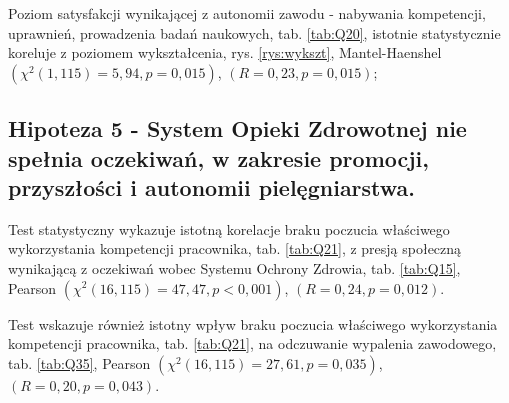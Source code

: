 \documentclass[a4paper,12pt,twoside,openright]{mwrep}
\begin{document}
  
  

Poziom satysfakcji wynikającej z autonomii zawodu  - nabywania kompetencji, uprawnień, prowadzenia badań naukowych, tab. \ref{tab:Q20}, istotnie statystycznie koreluje z poziomem wykształcenia, rys. \ref{rys:wykszt}, Mantel-Haenshel $(\chi^2 (1, 115) = 5,94, p = 0,015)$, $(R = 0,23, p = 0,015)$; 
 	
	


   
	

\vspace{\baselineskip} 

\subsection*{Hipoteza 5 - System Opieki Zdrowotnej nie spełnia oczekiwań, w zakresie promocji, przyszłości i autonomii pielęgniarstwa.}


Test statystyczny wykazuje istotną korelacje braku poczucia właściwego wykorzystania kompetencji pracownika, tab. \ref{tab:Q21}, z presją społeczną wynikającą z oczekiwań wobec Systemu Ochrony Zdrowia, tab. \ref{tab:Q15}, Pearson $(\chi^2 (16, 115) = 47,47, p < 0,001)$, $(R = 0,24, p = 0,012)$.


Test wskazuje również istotny wpływ braku poczucia właściwego wykorzystania kompetencji pracownika, tab. \ref{tab:Q21}, na odczuwanie wypalenia zawodowego, tab. \ref{tab:Q35}, Pearson $(\chi^2 (16, 115) = 27,61, p = 0,035)$, $(R = 0,20, p = 0,043)$.
\end{document}
